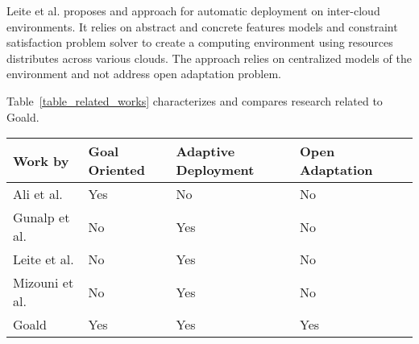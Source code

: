 
Leite et al. \cite{ferreira_leite_user_2014} proposes and approach for automatic deployment on inter-cloud environments. It relies on abstract and concrete features models and constraint satisfaction problem solver to create a computing environment using resources distributes across various clouds. The approach relies on centralized models of the environment and not address open adaptation problem.


Table~\ref{table_related_works} characterizes and compares research related to Goald.

\begin{table*}[]
\centering
\caption{Comparing characteristic properties of selected approaches related to Goald}
\label{table_related_works}
\begin{tabular}{|l|l|l|l|l|}
\hline
 \textbf{Work by} & \textbf{Goal Oriented} & \textbf{Adaptive Deployment} &  \textbf{Open Adaptation} \\ \hline
Ali et al.\citep{ali_requirements-driven_2014} & Yes & No & No \\ \hline
Gunalp et al.\citep{gunalp_rondo_2015} & No & Yes  &  No\\ \hline
Leite et al. \citep{ferreira_leite_user_2014}  & No & Yes & No \\ \hline
Mizouni et al. \citep{mizouni_framework_2014} & No & Yes & No \\ \hline
Goald & Yes & Yes & Yes \\ \hline
\end{tabular}
\end{table*}
